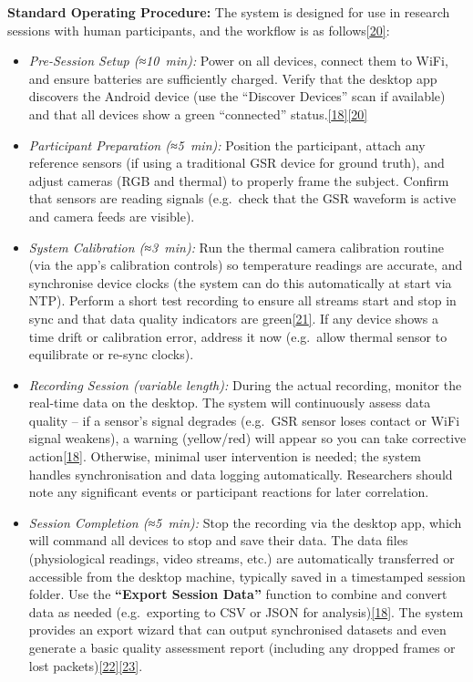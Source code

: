 \documentclass[12pt,a4paper]{article}
\begin{document}
\textbf{Standard Operating Procedure:} The system is designed for use in research sessions with human participants, and the workflow is as follows\href{docs/thesis_report/Chapter_7_Appendices.md\#L859-L866}{{[}20{]}}:

\begin{itemize}
\item
  \emph{Pre-Session Setup (≈10~min):} Power on all devices, connect them to WiFi, and ensure batteries are sufficiently charged. Verify that the desktop app discovers the Android device (use the ``Discover Devices'' scan if available) and that all devices show a green ``connected'' status.\href{docs/thesis_report/Chapter_7_Appendices.md\#L810-L818}{{[}18{]}}\href{docs/thesis_report/Chapter_7_Appendices.md\#L859-L866}{{[}20{]}}
\item
  \emph{Participant Preparation (≈5~min):} Position the participant, attach any reference sensors (if using a traditional GSR device for ground truth), and adjust cameras (RGB and thermal) to properly frame the subject. Confirm that sensors are reading signals (e.g.~check that the GSR waveform is active and camera feeds are visible).
\item
  \emph{System Calibration (≈3~min):} Run the thermal camera calibration routine (via the app's calibration controls) so temperature readings are accurate, and synchronise device clocks (the system can do this automatically at start via NTP). Perform a short test recording to ensure all streams start and stop in sync and that data quality indicators are green\href{docs/thesis_report/Chapter_7_Appendices.md\#L54-L62}{{[}21{]}}. If any device shows a time drift or calibration error, address it now (e.g.~allow thermal sensor to equilibrate or re-sync clocks).
\item
  \emph{Recording Session (variable length):} During the actual recording, monitor the real-time data on the desktop. The system will continuously assess data quality -- if a sensor's signal degrades (e.g.~GSR sensor loses contact or WiFi signal weakens), a warning (yellow/red) will appear so you can take corrective action\href{docs/thesis_report/Chapter_7_Appendices.md\#L810-L818}{{[}18{]}}. Otherwise, minimal user intervention is needed; the system handles synchronisation and data logging automatically. Researchers should note any significant events or participant reactions for later correlation.
\item
  \emph{Session Completion (≈5~min):} Stop the recording via the desktop app, which will command all devices to stop and save their data. The data files (physiological readings, video streams, etc.) are automatically transferred or accessible from the desktop machine, typically saved in a timestamped session folder. Use the \textbf{``Export Session Data''} function to combine and convert data as needed (e.g.~exporting to CSV or JSON for analysis)\href{docs/thesis_report/Chapter_7_Appendices.md\#L810-L818}{{[}18{]}}. The system provides an export wizard that can output synchronised datasets and even generate a basic quality assessment report (including any dropped frames or lost packets)\href{docs/thesis_report/Chapter_7_Appendices.md\#L870-L879}{{[}22{]}}\href{docs/thesis_report/Chapter_7_Appendices.md\#L882-L890}{{[}23{]}}.

\end{itemize}
\end{document}

